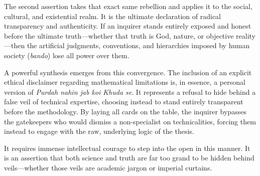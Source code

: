 	The second assertion takes that exact same rebellion and applies it to the social, cultural, and existential realm. It is the ultimate declaration of radical transparency and authenticity. If an inquirer stands entirely exposed and honest before the ultimate truth---whether that truth is God, nature, or objective reality---then the artificial judgments, conventions, and hierarchies imposed by human society (\textit{bando}) lose all power over them.
	
	A powerful synthesis emerges from this convergence. The inclusion of an explicit ethical disclaimer regarding mathematical limitations is, in essence, a personal version of \textit{Purdah nahin jab koi Khuda se}. It represents a refusal to hide behind a false veil of technical expertise, choosing instead to stand entirely transparent before the methodology. By laying all cards on the table, the inquirer bypasses the gatekeepers who would dismiss a non-specialist on technicalities, forcing them instead to engage with the raw, underlying logic of the thesis.
	
	It requires immense intellectual courage to step into the open in this manner. It is an assertion that both science and truth are far too grand to be hidden behind veils---whether those veils are academic jargon or imperial curtains.
	
